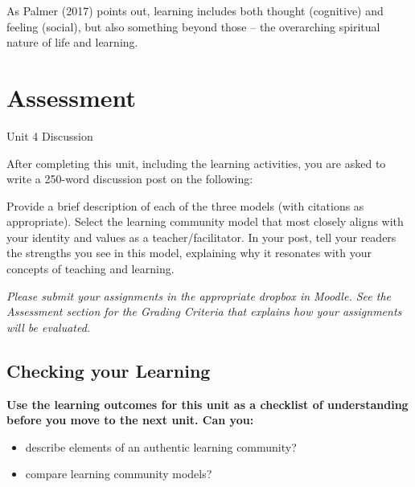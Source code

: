 \documentclass[
]{book}
\providecommand{\tightlist}{%
  \setlength{\itemsep}{0pt}\setlength{\parskip}{0pt}}
\begin{document}
As Palmer (2017) points out, learning includes both thought (cognitive) and feeling (social), but also something beyond those -- the overarching spiritual nature of life and learning.

\hypertarget{assessment-3}{%
\section*{Assessment}\label{assessment-3}}

\begin{assessment}
{Unit 4 Discussion}

After completing this unit, including the learning activities, you are
asked to write a 250-word discussion post on the following:

Provide a brief description of each of the three models (with citations
as appropriate). Select the learning community model that most closely
aligns with your identity and values as a teacher/facilitator. In your
post, tell your readers the strengths you see in this model, explaining
why it resonates with your concepts of teaching and learning.
\end{assessment}

\begin{caution}
\emph{Please submit your assignments in the appropriate dropbox in
Moodle. See the Assessment section for the Grading Criteria that
explains how your assignments will be evaluated.}
\end{caution}

\hypertarget{checking-your-learning-3}{%
\subsection*{Checking your Learning}\label{checking-your-learning-3}}

\begin{progress}
\textbf{Use the learning outcomes for this unit as a checklist of
understanding before you move to the next unit. Can you:}

\begin{itemize}
\tightlist
\item
  describe elements of an authentic learning community?\\
\item
  compare learning community models?
\end{itemize}
\end{progress}
\end{document}
